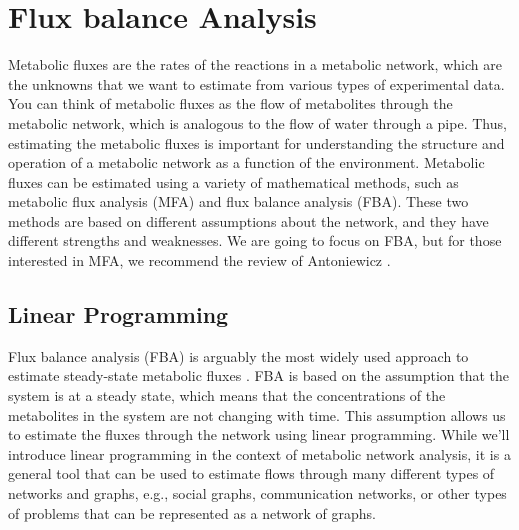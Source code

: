 \documentclass{article}[11pt]
\begin{document}
\section{Flux balance Analysis}\label{sec:FBA}
Metabolic fluxes are the rates of the reactions in a metabolic network, which are the unknowns that we want to estimate from various types of experimental data.
You can think of metabolic fluxes as the flow of metabolites through the metabolic network, which is analogous to the flow of water through a pipe.
Thus, estimating the metabolic fluxes is important for understanding the structure and operation of a metabolic network as a function of the environment.
Metabolic fluxes can be estimated using a variety of mathematical methods, such as metabolic flux analysis (MFA) and flux balance analysis (FBA).
These two methods are based on different assumptions about the network, and they have different strengths and weaknesses.
We are going to focus on FBA, but for those interested in MFA, we recommend the review of Antoniewicz \cite{ANTONIEWICZ20212}.

\subsection{Linear Programming}\label{sec:linear-programming}
Flux balance analysis (FBA) is arguably the most widely used approach to estimate steady-state metabolic fluxes \cite{Orth:2010aa}. 
FBA is based on the assumption that the system is at a steady state, which means that the concentrations of the metabolites in the system are not changing with time.
This assumption allows us to estimate the fluxes through the network using linear programming.
While we'll introduce linear programming in the context of metabolic network analysis, 
it is a general tool that can be used to estimate flows through many different types of networks and graphs, e.g., social graphs, communication networks, or other types of problems that can be represented as a network of graphs.
\end{document}
